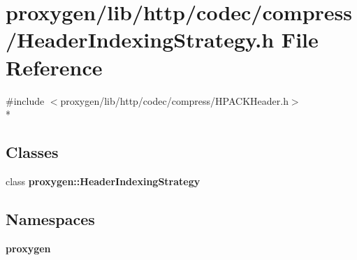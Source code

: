 \section{proxygen/lib/http/codec/compress/\+Header\+Indexing\+Strategy.h File Reference}
\label{HeaderIndexingStrategy_8h}
{\ttfamily \#include $<$proxygen/lib/http/codec/compress/\+H\+P\+A\+C\+K\+Header.\+h$>$}\\*
\subsection*{Classes}
\begin{DoxyCompactItemize}
\item 
class {\bf proxygen\+::\+Header\+Indexing\+Strategy}
\end{DoxyCompactItemize}
\subsection*{Namespaces}
\begin{DoxyCompactItemize}
\item 
 {\bf proxygen}
\end{DoxyCompactItemize}
